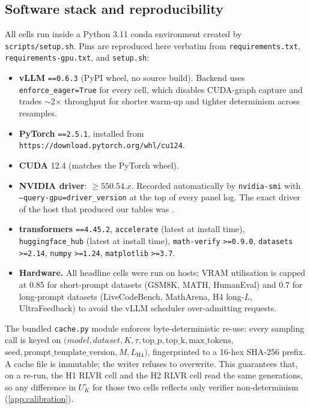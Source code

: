 \subsection{Software stack and reproducibility}
\label{app:config:stack}

All cells run inside a Python 3.11 conda environment created by
\texttt{scripts/setup.sh}. Pins are reproduced here verbatim from
\texttt{requirements.txt}, \texttt{requirements-gpu.txt}, and
\texttt{setup.sh}:

\begin{itemize}
\item \textbf{vLLM} \texttt{==0.6.3} (PyPI wheel, no source build).
      Backend uses \texttt{enforce\_eager=True} for every cell, which
      disables CUDA-graph capture and trades $\sim$2$\times$ throughput
      for shorter warm-up and tighter determinism across resamples.
\item \textbf{PyTorch} \texttt{==2.5.1}, installed from
      \texttt{https://download.pytorch.org/whl/cu124}.
\item \textbf{CUDA} 12.4 (matches the PyTorch wheel).
\item \textbf{NVIDIA driver}: $\geq 550.54.x$. Recorded automatically by
      \texttt{nvidia-smi} with
      \texttt{--query-gpu=driver\_version} at the top of every panel
      log. The exact driver of the host that produced our tables was
      .
\item \textbf{transformers} \texttt{==4.45.2},
      \texttt{accelerate} (latest at install time),
      \texttt{huggingface\_hub} (latest at install time),
      \texttt{math-verify} \texttt{>=0.9.0},
      \texttt{datasets} \texttt{>=2.14},
      \texttt{numpy} \texttt{>=1.24},
      \texttt{matplotlib} \texttt{>=3.7}.
\item \textbf{Hardware.} All headline cells were run on
       hosts;
      VRAM utilisation is capped at 0.85 for short-prompt datasets
      (GSM8K, MATH, HumanEval) and 0.7 for long-prompt datasets
      (LiveCodeBench, MathArena, H4 long-$L$, UltraFeedback) to avoid
      the vLLM scheduler over-admitting requests.
\end{itemize}

The bundled \texttt{cache.py} module enforces byte-deterministic
re-use: every sampling call is keyed on
$(model, dataset, K, \tau, \text{top\_p}, \text{top\_k}, \text{max\_tokens},$
$\text{seed}, \text{prompt\_template\_version}, M, L_{\text{H4}})$, fingerprinted to
a 16-hex SHA-256 prefix. A cache file is immutable; the writer refuses
to overwrite. This guarantees that, on a re-run, the H1 RLVR cell and
the H2 RLVR cell read the same generations, so any difference in
$U^\circ_K$ for those two cells reflects only verifier non-determinism
(\cref{app:calibration}).

